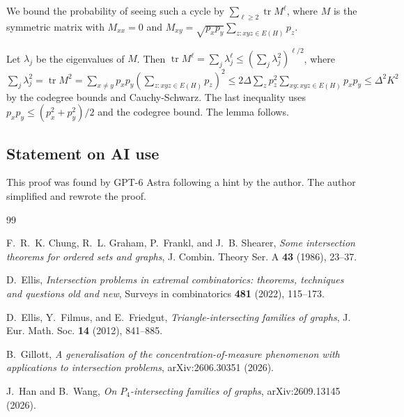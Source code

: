 \documentclass[10pt,a4paper]{amsart}
\newcommand{\1}{\mathbf 1}
\newcommand{\tr}{\operatorname{tr}}
\begin{document}
We bound the probability of seeing such a cycle by 
$\sum_{\ell \ge 2} \tr M^\ell$, where $M$ is the symmetric matrix with
$M_{xx}=0$ and $M_{xy} = \sqrt{p_xp_y}\sum_{z: xyz \in E(H)}p_z$.

Let \(\lambda_j\) be the eigenvalues of \(M\). Then
$\tr M^\ell = \sum_j \lambda_j^\ell \le\left(\sum_j\lambda_j^2\right)^{\ell/2}$,
where $\sum_j\lambda_j^2 = \tr M^2 = \sum_{x\ne y}p_xp_y
    \left(\sum_{z: xyz \in E(H) }p_z\right)^2 \le   
    2\Delta \sum_z p_z^2 \sum_{xy: xyz \in E(H)} p_xp_y
    \le \Delta^2K^2 $
by the codegree bounds and Cauchy-Schwarz.
The last inequality uses $p_x p_y \le (p_x^2+p_y^2)/2$
and the codegree bound. The lemma follows.

\subsection*{Statement on AI use}

This proof was found by GPT-6 Astra following a hint by the author.
The author simplified and rewrote the proof.

\begin{thebibliography}{99}

F.~R.~K. Chung, R.~L. Graham, P.~Frankl, and J.~B. Shearer,
\emph{Some intersection theorems for ordered sets and graphs},
J. Combin. Theory Ser. A \textbf{43} (1986), 23--37.

D.~Ellis,
\emph{Intersection problems in extremal combinatorics: theorems, techniques and questions old and new},
Surveys in combinatorics \textbf{481} (2022), 115--173.

D.~Ellis, Y.~Filmus, and E.~Friedgut,
\emph{Triangle-intersecting families of graphs},
J. Eur. Math. Soc. \textbf{14} (2012), 841--885.

B.~Gillott,
\emph{A generalisation of the concentration-of-measure phenomenon with applications to intersection problems},
arXiv:2606.30351 (2026).

J.~Han and B.~Wang,
\emph{On $P_4$-intersecting families of graphs},
arXiv:2609.13145 (2026).

\end{thebibliography}
\end{document}
